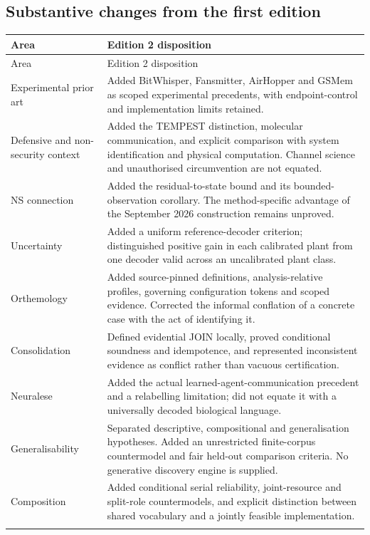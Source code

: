 \documentclass[11pt,a4paper]{article}
\theoremstyle{definition}
\theoremstyle{remark}
\begin{document}
\subsection{Substantive changes from the first edition}
\begin{longtable}{@{}>{\raggedright\arraybackslash}p{}>{\raggedright\arraybackslash}p{}@{}}
\toprule Area & Edition 2 disposition \\\midrule
\endfirsthead
\toprule Area & Edition 2 disposition \\\midrule
\endhead
Experimental prior art & Added BitWhisper, Fansmitter, AirHopper and GSMem as scoped experimental precedents, with endpoint-control and implementation limits retained. \\\addlinespace
Defensive and non-security context & Added the TEMPEST distinction, molecular communication, and explicit comparison with system identification and physical computation. Channel science and unauthorised circumvention are not equated. \\\addlinespace
NS connection & Added the residual-to-state bound and its bounded-observation corollary. The method-specific advantage of the September 2026 construction remains unproved. \\\addlinespace
Uncertainty & Added a uniform reference-decoder criterion; distinguished positive gain in each calibrated plant from one decoder valid across an uncalibrated plant class. \\\addlinespace
Orthemology & Added source-pinned definitions, analysis-relative profiles, governing configuration tokens and scoped evidence. Corrected the informal conflation of a concrete case with the act of identifying it. \\\addlinespace
Consolidation & Defined evidential JOIN locally, proved conditional soundness and idempotence, and represented inconsistent evidence as conflict rather than vacuous certification. \\\addlinespace
Neuralese & Added the actual learned-agent-communication precedent and a relabelling limitation; did not equate it with a universally decoded biological language. \\\addlinespace
Generalisability & Separated descriptive, compositional and generalisation hypotheses. Added an unrestricted finite-corpus countermodel and fair held-out comparison criteria. No generative discovery engine is supplied. \\\addlinespace
Composition & Added conditional serial reliability, joint-resource and split-role countermodels, and explicit distinction between shared vocabulary and a jointly feasible implementation. \\\addlinespace

\end{longtable}
\end{document}
